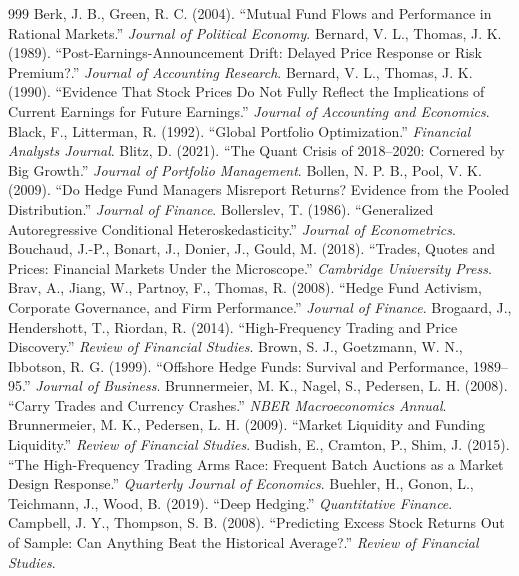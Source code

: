 \begin{thebibliography}{999}
 Berk, J. B., Green, R. C. (2004). ``Mutual Fund Flows and Performance in Rational Markets.'' \textit{Journal of Political Economy}.
 Bernard, V. L., Thomas, J. K. (1989). ``Post-Earnings-Announcement Drift: Delayed Price Response or Risk Premium?.'' \textit{Journal of Accounting Research}.
 Bernard, V. L., Thomas, J. K. (1990). ``Evidence That Stock Prices Do Not Fully Reflect the Implications of Current Earnings for Future Earnings.'' \textit{Journal of Accounting and Economics}.
 Black, F., Litterman, R. (1992). ``Global Portfolio Optimization.'' \textit{Financial Analysts Journal}.
 Blitz, D. (2021). ``The Quant Crisis of 2018–2020: Cornered by Big Growth.'' \textit{Journal of Portfolio Management}.
 Bollen, N. P. B., Pool, V. K. (2009). ``Do Hedge Fund Managers Misreport Returns? Evidence from the Pooled Distribution.'' \textit{Journal of Finance}.
 Bollerslev, T. (1986). ``Generalized Autoregressive Conditional Heteroskedasticity.'' \textit{Journal of Econometrics}.
 Bouchaud, J.-P., Bonart, J., Donier, J., Gould, M. (2018). ``Trades, Quotes and Prices: Financial Markets Under the Microscope.'' \textit{Cambridge University Press}.
 Brav, A., Jiang, W., Partnoy, F., Thomas, R. (2008). ``Hedge Fund Activism, Corporate Governance, and Firm Performance.'' \textit{Journal of Finance}.
 Brogaard, J., Hendershott, T., Riordan, R. (2014). ``High-Frequency Trading and Price Discovery.'' \textit{Review of Financial Studies}.
 Brown, S. J., Goetzmann, W. N., Ibbotson, R. G. (1999). ``Offshore Hedge Funds: Survival and Performance, 1989–95.'' \textit{Journal of Business}.
 Brunnermeier, M. K., Nagel, S., Pedersen, L. H. (2008). ``Carry Trades and Currency Crashes.'' \textit{NBER Macroeconomics Annual}.
 Brunnermeier, M. K., Pedersen, L. H. (2009). ``Market Liquidity and Funding Liquidity.'' \textit{Review of Financial Studies}.
 Budish, E., Cramton, P., Shim, J. (2015). ``The High-Frequency Trading Arms Race: Frequent Batch Auctions as a Market Design Response.'' \textit{Quarterly Journal of Economics}.
 Buehler, H., Gonon, L., Teichmann, J., Wood, B. (2019). ``Deep Hedging.'' \textit{Quantitative Finance}.
 Campbell, J. Y., Thompson, S. B. (2008). ``Predicting Excess Stock Returns Out of Sample: Can Anything Beat the Historical Average?.'' \textit{Review of Financial Studies}.

\end{thebibliography}
